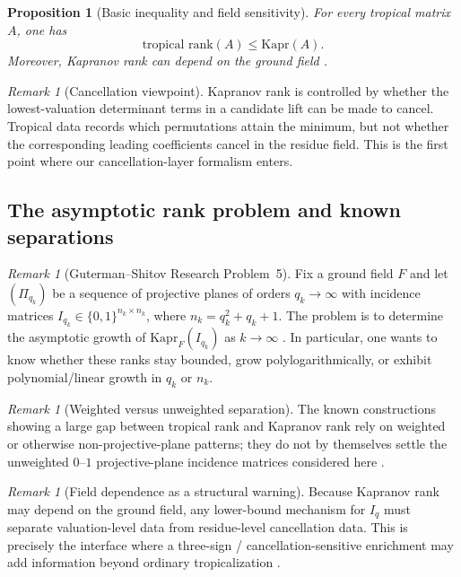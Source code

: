 \documentclass[11pt]{amsart}
\numberwithin{equation}{section}
\theoremstyle{plain}
\newtheorem{proposition}[theorem]{Proposition}
\theoremstyle{definition}
\theoremstyle{remark}
\newtheorem{remark}[theorem]{Remark}
\newcommand{\Kapr}{\mathrm{Kapr}}
\begin{document}
\begin{proposition}[Basic inequality and field sensitivity]
For every tropical matrix $A$, one has
\[
\text{tropical rank}(A)\le \Kapr(A).
\]
Moreover, Kapranov rank can depend on the ground field \cite{develinSantosSturmfels2005,gutermanShitov2016,shitov2011example,shitov2012kapranov,shitov2014}.
\end{proposition}

\begin{remark}[Cancellation viewpoint]
Kapranov rank is controlled by whether the lowest-valuation determinant terms in a candidate lift can be made to cancel. Tropical data
records which permutations attain the minimum, but not whether the corresponding leading coefficients cancel in the residue field. This is
 the first point where our cancellation-layer formalism enters.
\end{remark}

\subsection{The asymptotic rank problem and known separations}
\begin{remark}[Guterman--Shitov Research Problem~5]
Fix a ground field $F$ and let $(\Pi_{q_k})$ be a sequence of projective planes of orders $q_k\to\infty$ with incidence matrices
$ I_{q_k}\in\{0,1\}^{n_k\times n_k}$, where $n_k=q_k^2+q_k+1$. The problem is to determine the asymptotic growth of
$\Kapr_F(I_{q_k})$ as $k\to\infty$ \cite{gutermanShitov2016}. In particular, one wants to know whether these ranks stay bounded,
grow polylogarithmically, or exhibit polynomial/linear growth in $q_k$ or $n_k$.
\end{remark}

\begin{remark}[Weighted versus unweighted separation]
The known constructions showing a large gap between tropical rank and Kapranov rank rely on weighted or otherwise non-projective-plane patterns; they do not by themselves settle the unweighted $0$--$1$ projective-plane incidence matrices considered here \cite{kimRoush2006,shitov2011example,shitov2012kapranov,shitov2023separation,gutermanShitov2016}.
\end{remark}

\begin{remark}[Field dependence as a structural warning]
Because Kapranov rank may depend on the ground field, any lower-bound mechanism for $I_q$ must separate valuation-level data from
 residue-level cancellation data. This is precisely the interface where a three-sign / cancellation-sensitive enrichment may add information
 beyond ordinary tropicalization \cite{maclaganSturmfels2015,joswig2021}.
\end{remark}
\end{document}
